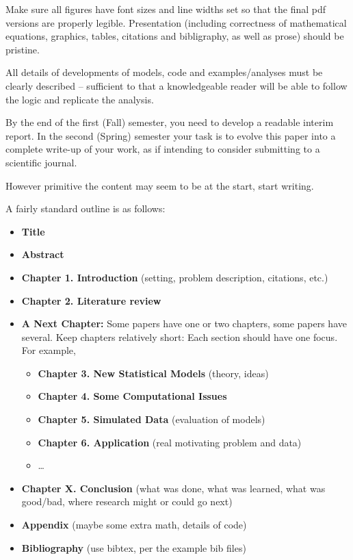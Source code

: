 \documentclass[12pt,twoside]{dukestatscithesis}
\providecommand{\tightlist}{%
  \setlength{\itemsep}{0pt}\setlength{\parskip}{0pt}}
\theoremstyle{definition}
\theoremstyle{definition}
\theoremstyle{definition}
\theoremstyle{remark}
\begin{document}
Make sure all figures have font sizes and line widths set so that the
final pdf versions are properly legible. Presentation (including
correctness of mathematical equations, graphics, tables, citations and
bibligraphy, as well as prose) should be pristine.

All details of developments of models, code and examples/analyses must
be clearly described -- sufficient to that a knowledgeable reader will
be able to follow the logic and replicate the analysis.

By the end of the first (Fall) semester, you need to develop a readable
interim report. In the second (Spring) semester your task is to evolve
this paper into a complete write-up of your work, as if intending to
consider submitting to a scientific journal.

However primitive the content may seem to be at the start, start
writing.

A fairly standard outline is as follows:
\begin{itemize}
\tightlist
\item
  \textbf{Title}
\item
  \textbf{Abstract}
\item
  \textbf{Chapter 1. Introduction} (setting, problem description,
  citations, etc.)
\item
  \textbf{Chapter 2. Literature review}
\item
  \textbf{A Next Chapter:} Some papers have one or two chapters, some
  papers have several. Keep chapters relatively short: Each section
  should have one focus. For example,
  \begin{itemize}
  \tightlist
  \item
    \textbf{Chapter 3. New Statistical Models} (theory, ideas)
  \item
    \textbf{Chapter 4. Some Computational Issues}
  \item
    \textbf{Chapter 5. Simulated Data} (evaluation of models)
  \item
    \textbf{Chapter 6. Application} (real motivating problem and data)
  \item
    \ldots{}
  \end{itemize}
\item
  \textbf{Chapter X. Conclusion} (what was done, what was learned, what
  was good/bad, where research might or could go next)
\item
  \textbf{Appendix} (maybe some extra math, details of code)
\item
  \textbf{Bibliography} (use bibtex, per the example bib files)
\end{itemize}
\end{document}
